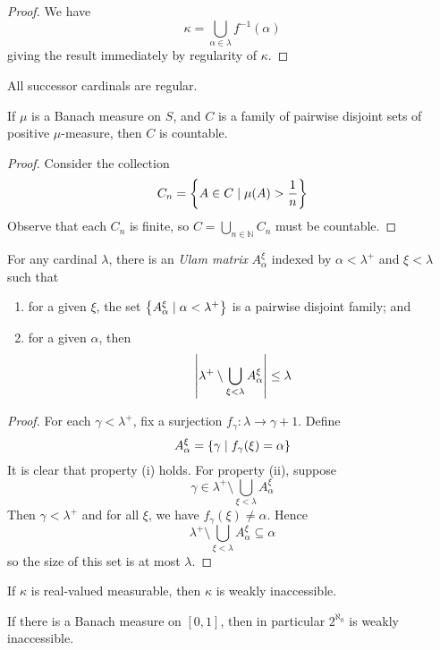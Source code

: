 \begin{proof}
    We have
    \[ \kappa = \bigcup_{\alpha \in \lambda} f^{-1}(\alpha) \]
    giving the result immediately by regularity of \( \kappa \).
\end{proof}
\begin{proposition}
    All successor cardinals are regular.
\end{proposition}
\begin{proposition}
    If \( \mu \) is a Banach measure on \( S \), and \( C \) is a family of pairwise disjoint sets of positive \( \mu \)-measure, then \( C \) is countable.
\end{proposition}
\begin{proof}
    Consider the collection
    \[ C_n = \qty{A \in C \mid \mu(A) > \frac{1}{n}} \]
    Observe that each \( C_n \) is finite, so \( C = \bigcup_{n \in \mathbb N} C_n \) must be countable.
\end{proof}
\begin{lemma}[Ulam]
    For any cardinal \( \lambda \), there is an \emph{Ulam matrix} \( A_\alpha^\xi \) indexed by \( \alpha < \lambda^+ \) and \( \xi < \lambda \) such that
    \begin{enumerate}
        \item for a given \( \xi \), the set \( \qty{A_\alpha^\xi \mid \alpha < \lambda^+} \) is a pairwise disjoint family; and
        \item for a given \( \alpha \), then
        \[ \abs{\lambda^+ \setminus \bigcup_{\xi < \lambda} A_\alpha^\xi} \leq \lambda \]
    \end{enumerate}
\end{lemma}
\begin{proof}
    For each \( \gamma < \lambda^+ \), fix a surjection \( f_\gamma : \lambda \to \gamma + 1 \).
    Define
    \[ A_\alpha^\xi = \qty{\gamma \mid f_\gamma(\xi) = \alpha} \]
    It is clear that property (i) holds.
    For property (ii), suppose
    \[ \gamma \in \lambda^+ \setminus \bigcup_{\xi < \lambda} A_\alpha^\xi \]
    Then \( \gamma < \lambda^+ \) and for all \( \xi \), we have \( f_\gamma(\xi) \neq \alpha \).
    Hence
    \[ \lambda^+ \setminus \bigcup_{\xi < \lambda} A_\alpha^\xi \subseteq \alpha \]
    so the size of this set is at most \( \lambda \).
\end{proof}
\begin{theorem}
    If \( \kappa \) is real-valued measurable, then \( \kappa \) is weakly inaccessible.
\end{theorem}
\begin{remark}
    If there is a Banach measure on \( [0,1] \), then in particular \( 2^{\aleph_0} \) is weakly inaccessible.
\end{remark}
